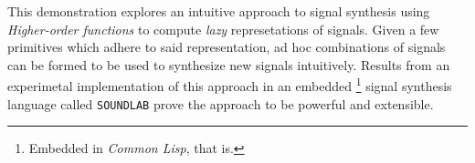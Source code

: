 This demonstration explores an intuitive approach to signal synthesis
using \textit{Higher-order functions} to compute \textit{lazy}
represetations of signals. Given a few primitives which adhere to said
representation, ad hoc combinations of signals can be formed to be used
to synthesize new signals intuitively. Results from an experimetal
implementation of this approach in an embedded \footnote{Embedded in
\textit{Common Lisp}, that is.} signal synthesis language called
\texttt{SOUNDLAB} prove the approach to be powerful and extensible.
